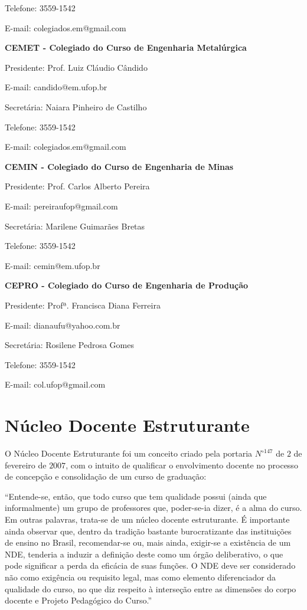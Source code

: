 Telefone: 3559-1542

E-mail: colegiados.em@gmail.com


\textbf{CEMET - Colegiado do Curso de Engenharia Metalúrgica}

Presidente: Prof. Luiz Cláudio Cândido

E-mail: candido@em.ufop.br

Secretária: Naiara Pinheiro de Castilho

Telefone: 3559-1542

E-mail: colegiados.em@gmail.com


\textbf{CEMIN - Colegiado do Curso de Engenharia de Minas}

Presidente: Prof. Carlos Alberto Pereira

E-mail: pereiraufop@gmail.com

Secretária: Marilene Guimarães Bretas

Telefone: 3559-1542

E-mail: cemin@em.ufop.br


\textbf{CEPRO - Colegiado do Curso de Engenharia de Produção}

Presidente: Profª. Francisca Diana Ferreira

E-mail: dianaufu@yahoo.com.br

Secretária: Rosilene Pedrosa Gomes

Telefone: 3559-1542

E-mail: col.ufop@gmail.com

\section{Núcleo Docente Estruturante}

O Núcleo Docente Estruturante foi um conceito criado pela portaria $N^{\circ 147}$ de $2$ de fevereiro de $2007$, com o intuito de qualificar o envolvimento docente no processo de concepção e consolidação de um curso de graduação:
\begin{citacao}
	``Entende-se, então, que todo curso que tem qualidade possui (ainda que informalmente) um grupo de professores que, poder-se-ia  dizer,  é a alma do curso. Em  outras palavras, trata-se de um núcleo docente estruturante.	É importante ainda observar que, dentro da tradição bastante  burocratizante  das instituições de ensino no Brasil, recomendar-se ou, mais ainda, exigir-se a existência de um NDE, tenderia a induzir a definição deste como um 
	órgão deliberativo, o que pode significar a perda da eficácia de suas funções. O NDE  deve ser considerado não como  exigência ou requisito legal, mas como elemento diferenciador da qualidade do curso, no que diz respeito à interseção entre as dimensões do corpo docente e Projeto Pedagógico do Curso.''
\end{citacao}

